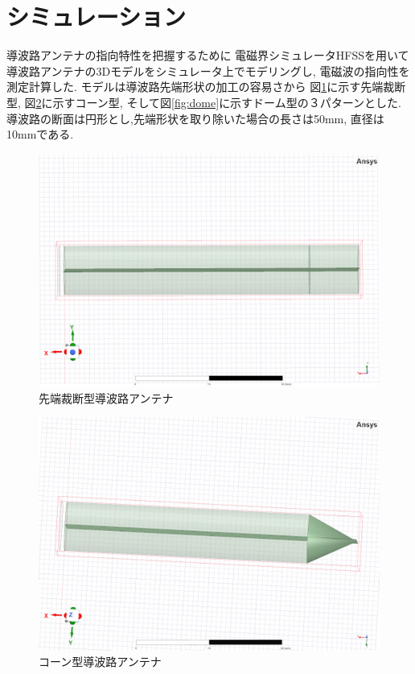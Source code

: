 \documentclass[technicalreport]{ieicej}
\begin{document}
\section{シミュレーション}

導波路アンテナの指向特性を把握するために 
電磁界シミュレータHFSSを用いて導波路アンテナの3Dモデルをシミュレータ上でモデリングし,
電磁波の指向性を測定計算した.
モデルは導波路先端形状の加工の容易さから
図\ref{fig:normal}に示す先端裁断型,
図\ref{fig:cone}に示すコーン型,
そして図\ref{fig:dome}に示すドーム型の３パターンとした.
導波路の断面は円形とし,先端形状を取り除いた場合の長さは50mm,
直径は10mmである.

\begin{figure}[tb]
  \begin{center}
    \includegraphics[bb=0 0 384 262, width=0.7\linewidth]{img/normal.pdf}
    \caption{先端裁断型導波路アンテナ}
    \label{fig:normal}
  \end{center}
\end{figure}

\begin{figure}[tb]
  \begin{center}
    \includegraphics[bb=0 0 384 262, width=0.7\linewidth]{img/cone.pdf}
    \caption{コーン型導波路アンテナ}
    \label{fig:cone}
  \end{center}
\end{figure}
\end{document}
